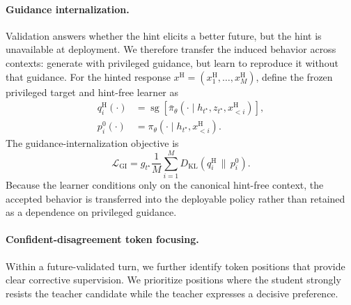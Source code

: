 \documentclass{article}
\begin{document}
\paragraph{Guidance internalization.}
Validation answers whether the hint elicits a better future, but the hint is unavailable at
deployment.  We therefore transfer the induced behavior across contexts: generate with privileged
guidance, but learn to reproduce it without that guidance.  For the hinted response
$x^{\mathrm H}=(x_1^{\mathrm H},\ldots,x_M^{\mathrm H})$, define the frozen privileged target and
hint-free learner as
\begin{equation}
\begin{aligned}
    q_i^{\mathrm H}(\cdot)
    &=\operatorname{sg}\!\left[
      \bar\pi_\theta(\cdot\mid h_{t^\star},z_{t^\star},x_{<i}^{\mathrm H})
      \right],\\
    p_i^0(\cdot)
    &=\pi_\theta(\cdot\mid h_{t^\star},x_{<i}^{\mathrm H}).
\end{aligned}
\label{eq:gi-distributions}
\end{equation}
The guidance-internalization objective is
\begin{equation}
    \mathcal L_{\mathrm{GI}}
    =g_{t^\star}\frac{1}{M}
      \sum_{i=1}^{M}
      D_{\mathrm{KL}}\!\left(q_i^{\mathrm H}\,\|\,p_i^0\right).
    \label{eq:gi-objective}
\end{equation}
Because the learner conditions only on the canonical hint-free context, the accepted behavior is
transferred into the deployable policy rather than retained as a dependence on privileged guidance.

\paragraph{Confident-disagreement token focusing.}

Within a future-validated turn, we further identify token positions that provide clear corrective
supervision.  We prioritize positions where the student strongly resists the teacher candidate while
the teacher expresses a decisive preference.
\end{document}
